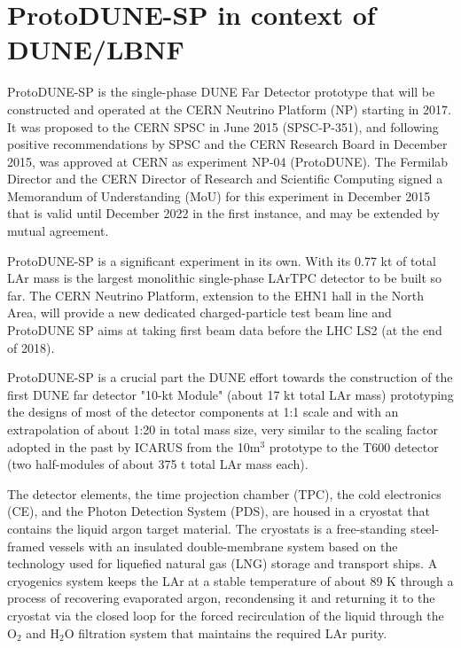 



\section{ProtoDUNE-SP in context of DUNE/LBNF}

ProtoDUNE-SP is the single-phase DUNE Far Detector prototype that will be constructed and operated at the CERN Neutrino Platform (NP) starting in 2017. It was proposed to the CERN SPSC in June 2015 (SPSC-P-351), and following positive recommendations by SPSC and the CERN Research Board in December 2015, was approved at CERN as experiment NP-04 (ProtoDUNE). The Fermilab Director and the CERN Director of Research and Scientific Computing signed a Memorandum of Understanding (MoU) for this experiment in December 2015 that is valid until December 2022 in the first instance, and may be extended by mutual agreement. 

ProtoDUNE-SP is a significant experiment in its own. With its 0.77 kt of total LAr mass is the
largest monolithic single-phase LArTPC detector to be built so far. 
The CERN Neutrino Platform, extension to the EHN1 hall in the North Area, will provide a new dedicated charged-particle test beam line and ProtoDUNE SP aims at taking first beam data before the LHC LS2 (at the end of 2018). 

ProtoDUNE-SP is a crucial part the DUNE effort towards the construction of the first DUNE far detector "10-kt Module" (about 17 kt total LAr mass) prototyping the designs of most of the detector components at 1:1 scale and with an extrapolation of about 1:20 in total mass size, very similar to the scaling factor adopted in the past by ICARUS from the 10m$^3$ prototype to the T600 detector (two half-modules of about 375 t total LAr mass each).

The detector elements, the time projection chamber (TPC), the cold electronics (CE), and the Photon Detection System (PDS), are housed in a cryostat that contains the liquid argon target material. The cryostats is a free-standing steel-framed vessels with an insulated double-membrane system based on the technology used for liquefied natural gas (LNG) storage and transport ships. 
A cryogenics system keeps the LAr at a stable temperature of about 89 K through a process of recovering evaporated argon, recondensing it and returning it to the cryostat via the closed loop 
for the forced recirculation of the liquid through the O$_2$ and H$_2$O filtration system that maintains the required LAr purity. 

